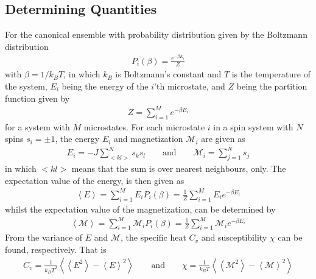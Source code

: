 \subsection{Determining Quantities}
\label{sec:DeterminingQuantities}
For the canonical ensemble with probability distribution given by the Boltzmann distribution
\begin{align}
	P_i (\beta ) = \frac{e^{-\beta E_i}}{Z}
	\label{eq:BoltzmannDistribution}
\end{align}  
with $\beta = 1/k_B T$, in which $k_B$ is Boltzmann's constant and $T$ is the temperature of the system, $E_i$ being the energy of the $i$'th microstate, and $Z$ being the partition function given by
\begin{align}
	Z = \sum _{i=1} ^M e^{-\beta E_i}
	\label{eq:PartitionFunction}
\end{align}  
for a system with $M$ microstates. 
For each microstate $i$ in a spin system with $N$ spins $s_i = \pm 1$, the energy $E_i$ and magnetization $\mathcal{M}_i$ are given as
\begin{align}
	E_i = -J \sum_{<kl>} ^N s_k s_l 
	\qquad \text{and} \qquad
	\mathcal{M} _i = \sum _{j=1} ^N s_j
	\label{eq:EnergyMagnetization}
\end{align}
in which $<kl>$ means that the sum is over nearest neighbours, only.  
The expectation value of the energy, is then given as
\begin{align}
	\left< E \right> = \sum _{i=1} ^M E_i P_i (\beta ) 
	= \frac{1}{Z} \sum _{i=1} ^M E_i e^{-\beta E_i } 
	\label{eq:ExpectationValueEnergy}
\end{align}
whilst the expectation value of the magnetization, can be determined by
\begin{align}
	\left< \mathcal{M} \right> = \sum _{i=1} ^M \mathcal{M}_i P_i (\beta ) 
	= \frac{1}{Z} \sum _{i=1} ^M \mathcal{M}_i e^{-\beta E_i } 
	\label{eq:ExpectationValueMagnetization}
\end{align}
From the variance of $E$ and $\mathcal{M}$, the specific heat $C_v$ and susceptibility $\chi$ can be found, respectively. 
That is
\begin{align}
	C_v = \frac{1}{k_B T^2} \left< \left< E^2 \right> - \left< E \right> ^2 \right>
	\qquad \text{and} \qquad
	\chi = \frac{1}{k_B T} \left< \left< \mathcal{M}^2 \right> - \left< \mathcal{M} \right> ^2 \right>
	\label{eq:SpecificHeatSusceptibility}
\end{align}